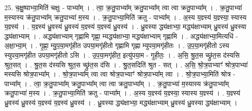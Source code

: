 \documentclass[17pt]{extarticle}
\begin{document}
25. च॒क्षु॒ष्पाभ्या॒मिति॑ चक्षुः - पाभ्या᳚म् । . त्वा॒ क्र॒तु॒पाभ्या᳚म् क्रतु॒पाभ्या᳚म् त्वा त्वा क्रतु॒पाभ्या᳚म् । . क्र॒तु॒पाभ्या॑ म॒स्यास्य क्र॑तु॒पाभ्या᳚म् क्रतु॒पाभ्या॑ म॒स्य । . क्र॒तु॒पाभ्या॒मिति॑ क्रतु - पाभ्या᳚म् । . अ॒स्य य॒ज्ञ्स्य॑ य॒ज्ञ्स्या॒ स्यास्य य॒ज्ञ्स्य॑ । . य॒ज्ञ्स्य॑ ध्रु॒वस्य॑ ध्रु॒वस्य॑ य॒ज्ञ्स्य॑ य॒ज्ञ्स्य॑ ध्रु॒वस्य॑ । . ध्रु॒वस्या द्ध्य॑क्षाभ्या॒ मद्ध्य॑क्षाभ्याम् ध्रु॒वस्य॑ ध्रु॒वस्या द्ध्य॑क्षाभ्याम् । . अद्ध्य॑क्षाभ्याम् गृह्णामि गृह्णा॒ म्यद्ध्य॑क्षाभ्या॒ मद्ध्य॑क्षाभ्याम् गृह्णामि । . अद्ध्य॑क्षाभ्या॒मित्यधि॑ - अ॒क्षा॒भ्या॒म् । . गृ॒ह्णा॒ म्यु॒प॒या॒मगृ॑हीत उपया॒मगृ॑हीतो गृह्णामि गृह्णा म्युपया॒मगृ॑हीतः । . उ॒प॒या॒मगृ॑हीतो ऽस्य स्युपया॒मगृ॑हीत उपया॒मगृ॑हीतो ऽसि । . उ॒प॒या॒मगृ॑हीत॒ इत्यु॑पया॒म - गृ॒ही॒तः॒ । . अ॒सि॒ श्रु॒त॒स च्छ्रु॑त॒स द॑स्यसि श्रुत॒सत् । . श्रु॒त॒स द॑स्यसि श्रुत॒स च्छ्रु॑त॒स द॑सि । . श्रु॒त॒सदिति॑ श्रुत - सत् । . अ॒सि॒ श्रो॒त्र॒पाभ्याꣳ॑ श्रोत्र॒पाभ्या॑ मस्यसि श्रोत्र॒पाभ्या᳚म् । . श्रो॒त्र॒पाभ्या᳚म् त्वा त्वा श्रोत्र॒पाभ्याꣳ॑ श्रोत्र॒पाभ्या᳚म् त्वा । . श्रो॒त्र॒पाभ्या॒मिति॑ श्रोत्र - पाभ्या᳚म् । . त्वा॒ क्र॒तु॒पाभ्या᳚म् क्रतु॒पाभ्या᳚म् त्वा त्वा क्रतु॒पाभ्या᳚म् । . क्र॒तु॒पाभ्या॑ म॒स्यास्य क्र॑तु॒पाभ्या᳚म् क्रतु॒पाभ्या॑ म॒स्य । . क्र॒तु॒पाभ्या॒मिति॑ क्रतु - पाभ्या᳚म् । . अ॒स्य य॒ज्ञ्स्य॑ य॒ज्ञ्स्या॒ स्यास्य य॒ज्ञ्स्य॑ । . य॒ज्ञ्स्य॑ ध्रु॒वस्य॑ ध्रु॒वस्य॑ य॒ज्ञ्स्य॑ य॒ज्ञ्स्य॑ ध्रु॒वस्य॑ । . ध्रु॒वस्या द्ध्य॑क्षाभ्या॒ मद्ध्य॑क्षाभ्याम् ध्रु॒वस्य॑ ध्रु॒वस्या द्ध्य॑क्षाभ्याम् । \newline
\end{document}
